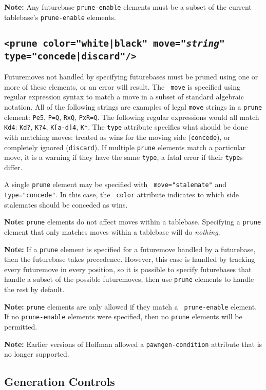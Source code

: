 \documentclass[11pt]{article}
\begin{document}
{\bf Note:} Any futurebase {\tt prune-enable} elements must be a subset of
the current tablebase's {\tt prune-enable} elements.

\subsection{\tt <prune color="white|black" move="{\it string}" type="concede|discard"/>}

Futuremoves not handled by specifying futurebases must be pruned using
one or more of these elements, or an error will result.  The {\tt
  move} is specified using regular expression syntax to match a move
in a subset of standard algebraic notation.  All of the following
strings are examples of legal {\tt move} strings in a {\tt prune}
element: {\tt Pe5}, {\tt P=Q}, {\tt RxQ}, {\tt PxR=Q}.  The following
regular expressions would all match {\tt Kd4}: {\tt Kd?}, {\tt K?4},
{\tt K[a-d]4}, {\tt K*}.  The {\tt type} attribute specifies what
should be done with matching moves: treated as wins for the moving
side ({\tt concede}), or completely ignored ({\tt discard}).  If
multiple {\tt prune} elements match a particular move, it is a warning
if they have the same {\tt type}, a fatal error if their {\tt type}s
differ.

A single {\tt prune} element may be specified with {\tt
move="stalemate"} and {\tt type="concede"}.  In this case, the {\tt
color} attribute indicates to which side stalemates should be conceded
as wins.

{\bf Note:} {\tt prune} elements do not affect moves within a
tablebase.  Specifying a {\tt prune} element that only matches
moves within a tablebase will do {\it nothing}.

{\bf Note:} If a {\tt prune} element is specified for a futuremove
handled by a futurebase, then the futurebase takes precedence.
However, this case is handled by tracking every futuremove in every
position, so it is possible to specify futurebases that handle a
subset of the possible futuremoves, then use {\tt prune} elements to
handle the rest by default.

{\bf Note:} {\tt prune} elements are only allowed if they match a {\tt
prune-enable} element.  If no {\tt prune-enable} elements were
specified, then no {\tt prune} elements will be permitted.

{\bf Note:} Earlier versions of Hoffman allowed a {\tt pawngen-condition}
attribute that is no longer supported.

\subsection{Generation Controls}
\end{document}
